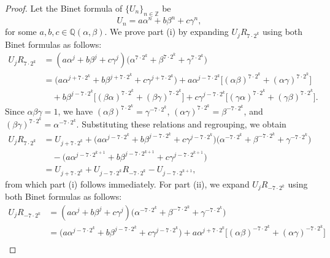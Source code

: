 \documentclass[11pt,a4paper]{article}
\numberwithin{equation}{section}
\numberwithin{table}{section}
\numberwithin{figure}{section}
\begin{document}
\begin{proof}
	Let the Binet formula of $\{U_n\}_{n\in\mathbb{Z}}$ be
	\begin{equation*}
		U_n = a\alpha^n + b\beta^n + c\gamma^n,
	\end{equation*}
	for some $a, b, c \in \mathbb{Q}(\alpha,\beta)$.
	We prove part (i) by expanding $U_j R_{7\cdot 2^k}$ using both Binet formulas as follows:
	\begin{align*}
		U_j R_{7\cdot 2^k} 
		&= \left(a\alpha^j + b\beta^j + c\gamma^j\right)
		\big(\alpha^{7\cdot 2^k} + \beta^{7\cdot 2^k} 
		+ \gamma^{7\cdot 2^k}\big)\\
		&= \big(a\alpha^{j+7\cdot 2^k} + b\beta^{j+7\cdot 2^k} 
		+ c\gamma^{j+7\cdot 2^k}\big)
		 + a\alpha^{j-7\cdot 2^k}
		\big[(\alpha\beta)^{7\cdot 2^k} 
		+ (\alpha\gamma)^{7\cdot 2^k}\big]\\
		&\quad + b\beta^{j-7\cdot 2^k}
		\big[(\beta\alpha)^{7\cdot 2^k} 
		+ (\beta\gamma)^{7\cdot 2^k}\big]
		 + c\gamma^{j-7\cdot 2^k}
		\big[(\gamma\alpha)^{7\cdot 2^k} 
		+ (\gamma\beta)^{7\cdot 2^k}\big].
	\end{align*}
	Since $\alpha\beta\gamma = 1$, we have $(\alpha\beta)^{7\cdot 2^k} 
	= \gamma^{-7\cdot 2^k}$, $(\alpha\gamma)^{7\cdot 2^k} 
	= \beta^{-7\cdot 2^k}$, and $(\beta\gamma)^{7\cdot 2^k} 
	= \alpha^{-7\cdot 2^k}$. Substituting these relations and 
	regrouping, we obtain
	\begin{align*}
		U_j R_{7\cdot 2^k} 
		&= U_{j+7\cdot 2^k} 
		+ \big(a\alpha^{j-7\cdot 2^k} 
		+ b\beta^{j-7\cdot 2^k} 
		+ c\gamma^{j-7\cdot 2^k}\big)
		\big(\alpha^{-7\cdot 2^k} + \beta^{-7\cdot 2^k} 
		+ \gamma^{-7\cdot 2^k}\big)\\
		&\quad - \big(a\alpha^{j-7\cdot 2^{k+1}} 
		+ b\beta^{j-7\cdot 2^{k+1}} 
		+ c\gamma^{j-7\cdot 2^{k+1}}\big)\\
		&= U_{j+7\cdot 2^k} + U_{j-7\cdot 2^k}R_{-7\cdot 2^k} 
		- U_{j-7\cdot 2^{k+1}},
	\end{align*}
	from which part (i) follows immediately. For part (ii), we expand $U_j R_{-7\cdot 2^k}$ using 
	both Binet formulas as follows:
	\begin{align*}
		U_j R_{-7\cdot 2^k} 
		&= \left(a\alpha^j + b\beta^j + c\gamma^j\right)
		\big(\alpha^{-7\cdot 2^k} + \beta^{-7\cdot 2^k} 
		+ \gamma^{-7\cdot 2^k}\big)\\
		&= \big(a\alpha^{j-7\cdot 2^k} + b\beta^{j-7\cdot 2^k} 
		+ c\gamma^{j-7\cdot 2^k}\big)
		 + a\alpha^{j+7\cdot 2^k}
		\big[(\alpha\beta)^{-7\cdot 2^k} 
		+ (\alpha\gamma)^{-7\cdot 2^k}\big]\\

\end{align*}
\end{proof}
\end{document}
